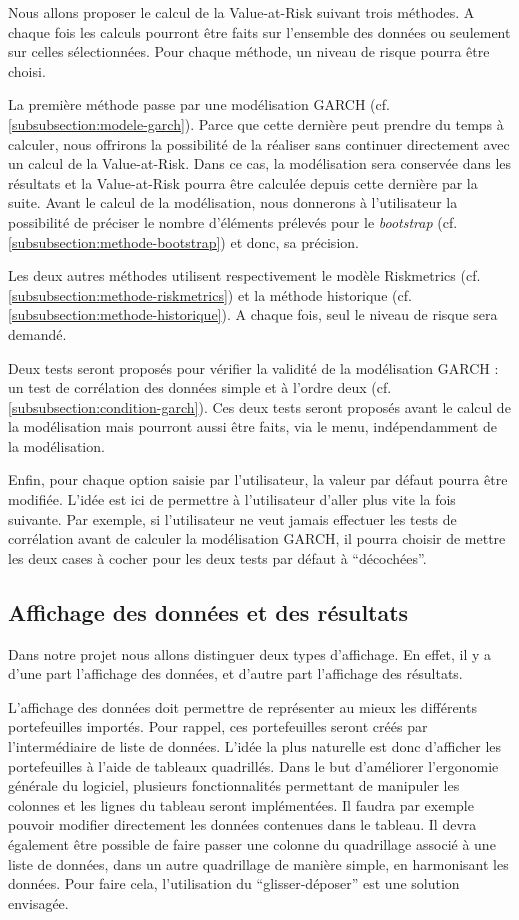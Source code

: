 		Nous allons proposer le calcul de la Value-at-Risk suivant trois méthodes. A chaque fois les calculs pourront être faits sur l'ensemble des données ou seulement sur celles sélectionnées. Pour chaque méthode, un niveau de risque pourra être choisi.

		La première méthode passe par une modélisation GARCH (cf. \ref{subsubsection:modele-garch}). Parce que cette dernière peut prendre du temps à calculer, nous offrirons la possibilité de la réaliser sans continuer directement avec un calcul de la Value-at-Risk. Dans ce cas, la modélisation sera conservée dans les résultats et la Value-at-Risk pourra être calculée depuis cette dernière par la suite. Avant le calcul de la modélisation, nous donnerons à l'utilisateur la possibilité de préciser le nombre d'éléments prélevés pour le \textit{bootstrap} (cf. \ref{subsubsection:methode-bootstrap}) et donc, sa précision.

		Les deux autres méthodes utilisent respectivement le modèle Riskmetrics (cf. \ref{subsubsection:methode-riskmetrics}) et la méthode historique (cf. \ref{subsubsection:methode-historique}). A chaque fois, seul le niveau de risque sera demandé.

		Deux tests seront proposés pour vérifier la validité de la modélisation GARCH : un test de corrélation des données simple et à l'ordre deux (cf. \ref{subsubsection:condition-garch}). Ces deux tests seront proposés avant le calcul de la modélisation mais pourront aussi être faits, via le menu, indépendamment de la modélisation.

		Enfin, pour chaque option saisie par l'utilisateur, la valeur par défaut pourra être modifiée. L'idée est ici de permettre à l'utilisateur d'aller plus vite la fois suivante. Par exemple, si l'utilisateur ne veut jamais effectuer les tests de corrélation avant de calculer la modélisation GARCH, il pourra choisir de mettre les deux cases à cocher pour les deux tests par défaut à “décochées”.


	\subsection{Affichage des données et des résultats} 
		Dans notre projet nous allons distinguer deux types d'affichage. En effet, il y a d'une part l'affichage des données, et d'autre part l'affichage des résultats.

		L'affichage des données doit permettre de représenter au mieux les différents portefeuilles importés. Pour rappel, ces portefeuilles seront créés par l'intermédiaire de liste de données. L'idée la plus naturelle est donc d'afficher les portefeuilles à l'aide de tableaux quadrillés. Dans le but d'améliorer l'ergonomie générale du logiciel, plusieurs fonctionnalités permettant de manipuler les colonnes et les lignes du tableau seront implémentées. Il faudra par exemple pouvoir modifier directement les données contenues dans le tableau. Il devra également être possible de faire passer une colonne du quadrillage associé à une liste de données, dans un autre quadrillage de manière simple, en harmonisant les données. Pour faire cela, l'utilisation du “glisser-déposer” est une solution envisagée.

